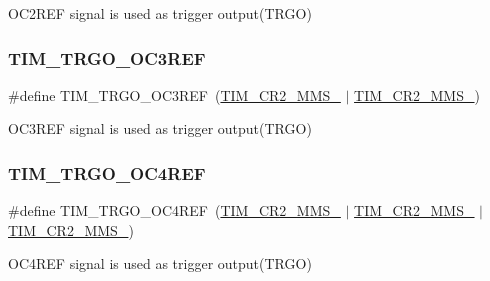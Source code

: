 O\+C2\+R\+EF signal is used as trigger output(\+T\+R\+G\+O) \mbox{\label{group___t_i_m___master___mode___selection_ga4bc4791f8b9560950d30078b96d08f55}} 
\subsubsection{\texorpdfstring{TIM\_TRGO\_OC3REF}{TIM\_TRGO\_OC3REF}}
{\footnotesize\ttfamily \#define T\+I\+M\+\_\+\+T\+R\+G\+O\+\_\+\+O\+C3\+R\+EF~(\mbox{\hyperlink{group___peripheral___registers___bits___definition_gacb74a815afdd856d51cfcf1ddf3fce6a}{T\+I\+M\+\_\+\+C\+R2\+\_\+\+M\+M\+S\+\_}} $\vert$ \mbox{\hyperlink{group___peripheral___registers___bits___definition_ga4b1036929b0a4ba5bd5cced9b8e0f4c3}{T\+I\+M\+\_\+\+C\+R2\+\_\+\+M\+M\+S\+\_}})}

O\+C3\+R\+EF signal is used as trigger output(\+T\+R\+G\+O) \mbox{\label{group___t_i_m___master___mode___selection_ga7fe6228adec5d1b6f0a8ed8da111db4d}} 
\subsubsection{\texorpdfstring{TIM\_TRGO\_OC4REF}{TIM\_TRGO\_OC4REF}}
{\footnotesize\ttfamily \#define T\+I\+M\+\_\+\+T\+R\+G\+O\+\_\+\+O\+C4\+R\+EF~(\mbox{\hyperlink{group___peripheral___registers___bits___definition_gacb74a815afdd856d51cfcf1ddf3fce6a}{T\+I\+M\+\_\+\+C\+R2\+\_\+\+M\+M\+S\+\_}} $\vert$ \mbox{\hyperlink{group___peripheral___registers___bits___definition_ga4b1036929b0a4ba5bd5cced9b8e0f4c3}{T\+I\+M\+\_\+\+C\+R2\+\_\+\+M\+M\+S\+\_}} $\vert$ \mbox{\hyperlink{group___peripheral___registers___bits___definition_gaf3e55308e84106d6501201e66bd46ab6}{T\+I\+M\+\_\+\+C\+R2\+\_\+\+M\+M\+S\+\_}})}

O\+C4\+R\+EF signal is used as trigger output(\+T\+R\+G\+O) \mbox{\label{group___t_i_m___master___mode___selection_ga32a8e436f2c0818a657b0d3fcf4e872d}} 
